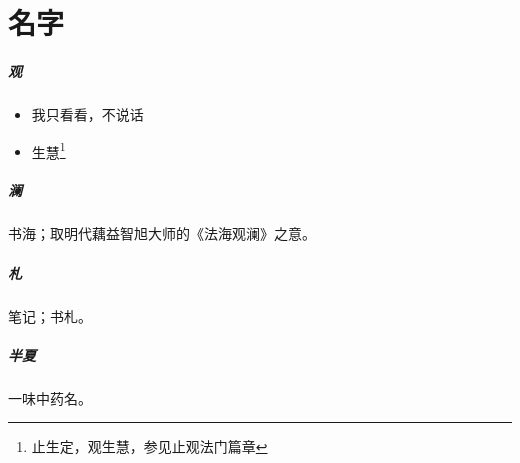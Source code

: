 \chapter{名字}

\paragraph{观}
\begin{itemize}
  \item 我只看看，不说话
  \item 生慧\footnote{止生定，观生慧，参见止观法门篇章}
\end{itemize}

\paragraph{澜}
书海；取明代藕益智旭大师的《法海观澜》之意。

\paragraph{札}
笔记；书札。

\paragraph{半夏}
一味中药名\smiley。
